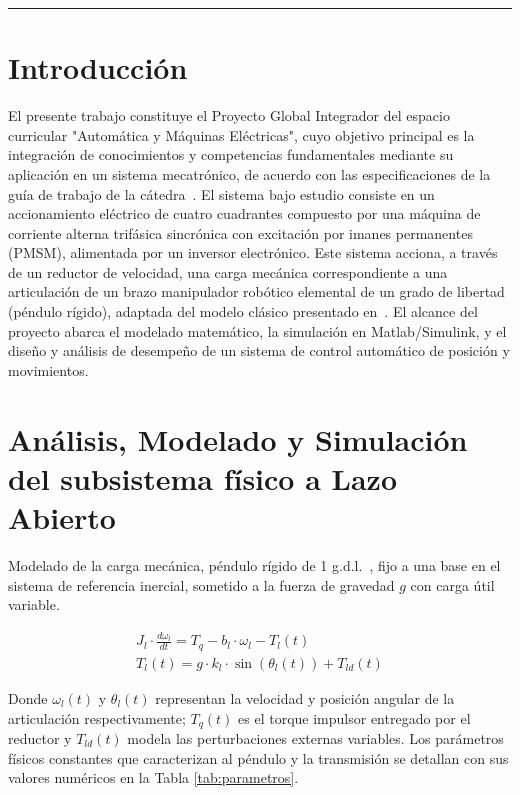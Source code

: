 \documentclass[12pt, a4paper,journal, onecolumn, compsoc]{IEEEtran}
\begin{document}
\vspace{4pt}
\noindent\rule{\textwidth}{0.4pt}

\section{Introducción}
El presente trabajo constituye el Proyecto Global Integrador del espacio curricular "Automática y Máquinas Eléctricas", cuyo objetivo principal es la integración de conocimientos y competencias fundamentales mediante su aplicación en un sistema mecatrónico, de acuerdo con las especificaciones de la guía de trabajo de la cátedra~\cite{guia_trabajo}.
El sistema bajo estudio consiste en un accionamiento eléctrico de cuatro cuadrantes compuesto por una máquina de corriente alterna trifásica sincrónica con excitación por imanes permanentes (PMSM), alimentada por un inversor electrónico. Este sistema acciona, a través de un reductor de velocidad, una carga mecánica correspondiente a una articulación de un brazo manipulador robótico elemental de un grado de libertad (péndulo rígido), adaptada del modelo clásico presentado en~\cite{kelly_robot}.
El alcance del proyecto abarca el modelado matemático, la simulación en Matlab/Simulink, y el diseño y análisis de desempeño de un sistema de control automático de posición y movimientos.

\section{Análisis, Modelado y Simulación del subsistema físico a Lazo Abierto}
Modelado de la carga mecánica, péndulo rígido de 1 g.d.l.~\cite{kelly_robot}, fijo a una base en el sistema de referencia inercial, sometido a la fuerza de gravedad \(g\) con carga útil variable.

\begin{align}
    J_l\cdot \frac{d\omega_l}{dt} = T_q - b_l\cdot \omega_l - T_l(t)  \\
    T_l(t) = g\cdot k_l \cdot \sin(\theta_l(t)) + T_{ld}(t)
\end{align}

Donde $\omega_l(t)$ y $\theta_l(t)$ representan la velocidad y posición angular de la articulación respectivamente; $T_q(t)$ es el torque impulsor entregado por el reductor y $T_{ld}(t)$ modela las perturbaciones externas variables. Los parámetros físicos constantes que caracterizan al péndulo y la transmisión se detallan con sus valores numéricos en la Tabla \ref{tab:parametros}.
\end{document}
